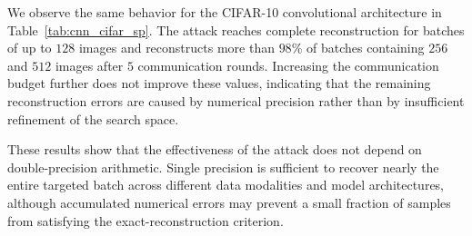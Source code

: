 We observe the same behavior for the CIFAR-10 convolutional architecture in Table~\ref{tab:cnn_cifar_sp}. The attack reaches complete reconstruction for batches of up to $128$ images and reconstructs more than $98\%$ of batches containing $256$ and $512$ images after $5$ communication rounds. Increasing the communication budget further does not improve these values, indicating that the remaining reconstruction errors are caused by numerical precision rather than by insufficient refinement of the search space.

These results show that the effectiveness of the attack does not depend on double-precision arithmetic. Single precision is sufficient to recover nearly the entire targeted batch across different data modalities and model architectures, although accumulated numerical errors may prevent a small fraction of samples from satisfying the exact-reconstruction criterion.

